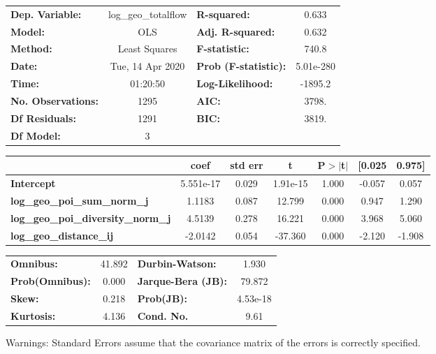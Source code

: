 \begin{center}
\begin{tabular}{lclc}
\toprule
\textbf{Dep. Variable:}                    & log\_geo\_totalflow & \textbf{  R-squared:         } &     0.633   \\
\textbf{Model:}                            &         OLS         & \textbf{  Adj. R-squared:    } &     0.632   \\
\textbf{Method:}                           &    Least Squares    & \textbf{  F-statistic:       } &     740.8   \\
\textbf{Date:}                             &   Tue, 14 Apr 2020  & \textbf{  Prob (F-statistic):} & 5.01e-280   \\
\textbf{Time:}                             &       01:20:50      & \textbf{  Log-Likelihood:    } &   -1895.2   \\
\textbf{No. Observations:}                 &          1295       & \textbf{  AIC:               } &     3798.   \\
\textbf{Df Residuals:}                     &          1291       & \textbf{  BIC:               } &     3819.   \\
\textbf{Df Model:}                         &             3       & \textbf{                     } &             \\
\bottomrule
\end{tabular}
\begin{tabular}{lcccccc}
                                           & \textbf{coef} & \textbf{std err} & \textbf{t} & \textbf{P$> |$t$|$} & \textbf{[0.025} & \textbf{0.975]}  \\
\midrule
\textbf{Intercept}                         &    5.551e-17  &        0.029     &  1.91e-15  &         1.000        &       -0.057    &        0.057     \\
\textbf{log\_geo\_poi\_sum\_norm\_j}       &       1.1183  &        0.087     &    12.799  &         0.000        &        0.947    &        1.290     \\
\textbf{log\_geo\_poi\_diversity\_norm\_j} &       4.5139  &        0.278     &    16.221  &         0.000        &        3.968    &        5.060     \\
\textbf{log\_geo\_distance\_ij}            &      -2.0142  &        0.054     &   -37.360  &         0.000        &       -2.120    &       -1.908     \\
\bottomrule
\end{tabular}
\begin{tabular}{lclc}
\textbf{Omnibus:}       & 41.892 & \textbf{  Durbin-Watson:     } &    1.930  \\
\textbf{Prob(Omnibus):} &  0.000 & \textbf{  Jarque-Bera (JB):  } &   79.872  \\
\textbf{Skew:}          &  0.218 & \textbf{  Prob(JB):          } & 4.53e-18  \\
\textbf{Kurtosis:}      &  4.136 & \textbf{  Cond. No.          } &     9.61  \\
\bottomrule
\end{tabular}
\end{center}

Warnings: \newline
 [1] Standard Errors assume that the covariance matrix of the errors is correctly specified.